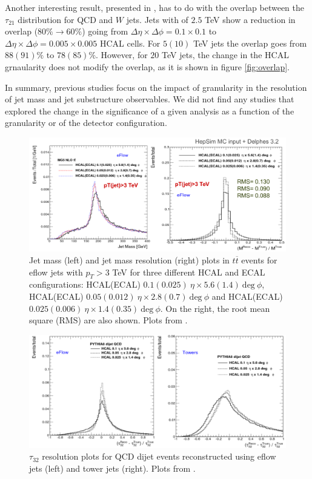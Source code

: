 Another interesting result, presented in \cite{BOOST2017}, has to do with the overlap between the $\tau_{21}$ distribution for QCD and $W$ jets. Jets with of $2.5$ TeV show a reduction in overlap ($80\%\rightarrow 60\%$) going from $\Delta\eta\times\Delta\phi=0.1\times 0.1$ to $\Delta\eta\times\Delta\phi=0.005\times 0.005$ HCAL cells. For $5(10)$ TeV jets the overlap goes from $88(91)\%$ to $78(85)\%$. However, for $20$ TeV jets, the change in the HCAL grnaularity does not modify the overlap, as it is shown in figure \ref{fig:overlap}. 

In summary, previous studies focus on the impact of granularity in the resolution of jet mass and jet substructure observables. We did not find any studies that explored the change in the significance of a given analysis as a function of the granularity or of the detector configuration.

\begin{figure}
	\centering
	\includegraphics[width=\textwidth]{./Figures/hcal_gran_jet_mass.png}
	\caption{Jet mass (left) and jet mass resolution (right) plots in $t\overline{t}$ events for eflow jets with $p_T>3$ TeV for three different HCAL and ECAL configurations: HCAL(ECAL) $0.1(0.025)~\eta \times 5.6(1.4)~\text{deg}~\phi$, HCAL(ECAL) $0.05(0.012)~\eta \times 2.8(0.7)~\text{deg}~\phi$ and HCAL(ECAL) $0.025(0.006)~\eta \times 1.4(0.35)~\text{deg}~\phi$. On the right, the root mean square (RMS) are also shown. Plots from \cite{BOOST2017}.}
	\label{fig:hcal_gran_jet_mass}
\end{figure}

\begin{figure}
	\centering
	\includegraphics[width=\textwidth]{./Figures/hcal_gran_tau32.png}
	\caption{$\tau_{32}$ resolution plots for QCD dijet events reconstructed using eflow jets (left) and tower jets (right). Plots from \cite{FCCweek2015}.}
	\label{fig:hcal_gran_tau32}
\end{figure}

